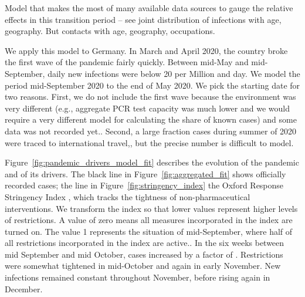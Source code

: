 Model that makes the most of many available data sources to gauge the relative effects in
this transition period -- see joint distribution of infections with age, geography. But
contacts with age, geography, occupations.

We apply this model to Germany. In March and April 2020, the country broke the first wave
of the pandemic fairly quickly. Between mid-May and mid-September, daily new infections
were below 20 per Million and day. We model the
period mid-September 2020 to the end of May 2020. We pick the starting date for two
reasons. First, we do not include the first wave because the environment was very
different (e.g., aggregate PCR test capacity was much lower and we would require a very
different model for calculating the share of known cases) and some data was not recorded
yet.. Second, a
large fraction cases during summer of 2020 were traced to international
travel,, but the precise number is difficult to model.

Figure~\ref{fig:pandemic_drivers_model_fit} describes the evolution of the pandemic and
of its drivers. The black line in Figure~\ref{fig:aggregated_fit} shows officially
recorded cases; the  line in
Figure~\ref{fig:stringency_index} the Oxford Response Stringency Index \citep{Hale2020},
which tracks the tightness of non-pharmaceutical interventions. We transform the index so
that lower values represent higher levels of restrictions. A value of zero means all
measures incorporated in the index are turned on. The value 1 represents the situation of
mid-September, where half of all restrictions incorporated in the index are
active.. In the six weeks between mid September and mid October, cases
increased by a factor of . Restrictions were somewhat tightened in mid-October and again in early
November. New infections remained constant throughout November, before rising again in
December.

